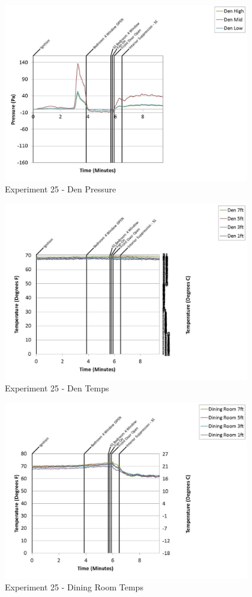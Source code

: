 \documentclass{article}
\begin{document}
\begin{appendices}
	\clearpage

	\begin{figure}[h!]
		\centering
		\includegraphics[height=3.05in]{0_Images/Results_Charts/Exp_25_Charts/DenPressure.pdf}
		\caption{Experiment 25 - Den Pressure}
	\end{figure}
 

	\begin{figure}[h!]
		\centering
		\includegraphics[height=3.05in]{0_Images/Results_Charts/Exp_25_Charts/DenTemps.pdf}
		\caption{Experiment 25 - Den Temps}
	\end{figure}
 
	\clearpage

	\begin{figure}[h!]
		\centering
		\includegraphics[height=3.05in]{0_Images/Results_Charts/Exp_25_Charts/DiningRoomTemps.pdf}
		\caption{Experiment 25 - Dining Room Temps}
	\end{figure}
 


\end{appendices}
\end{document}

